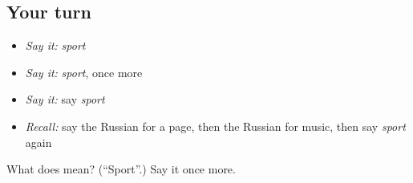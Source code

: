 \subsection*{Your turn}
\begin{itemize}
\raggedright
  \item \emph{Say it:} \emph{sport}
  \item \emph{Say it:} \emph{sport}, once more
  \item \emph{Say it:} say \emph{sport}
  \item \emph{Recall:} say the Russian for a page, then the Russian for music, then say \emph{sport} again
\end{itemize}

\begin{tcolorbox}[breakable,colback=teal!4,colframe=teal!35!black,title={Before you move on}]
What does  mean? (\textquotedblleft{}Sport\textquotedblright{}.) Say it once more.
\end{tcolorbox}
